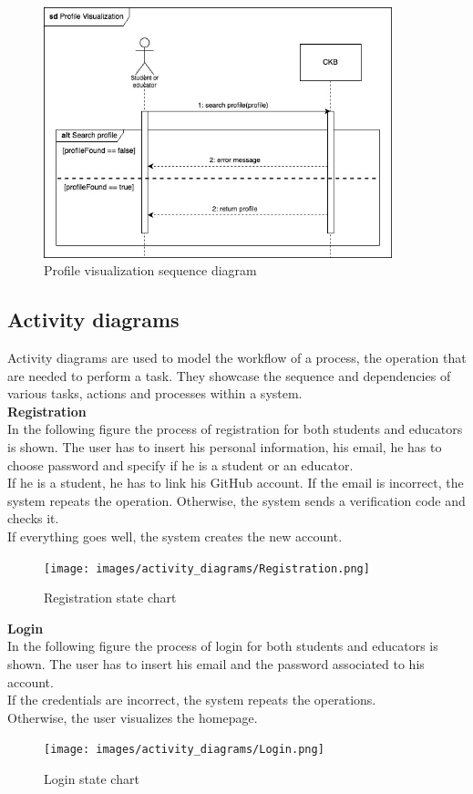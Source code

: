 \begin{figure}[H]
    \centering
    \includegraphics[width=0.9\textwidth]{images/seq_diagrams/profile_visualization.jpg}
    \caption{Profile visualization sequence diagram}
\end{figure}
\clearpage

\subsection{Activity diagrams}
Activity diagrams are used to model the workflow of a process, the operation that are needed to perform a task.
They showcase the sequence and dependencies of various tasks, actions and processes within a system.\\

\textbf{Registration}\\
In the following figure the process of registration for both students and educators is shown. 
The user has to insert his personal information, his email, he has to choose password and specify if he is a student or an educator.\\
If he is a student, he has to link his GitHub account. 
If the email is incorrect, the system repeats the operation. Otherwise, the system
 sends a verification code and checks it.\\If everything goes well, the system creates the new account.
\begin{figure} [H]
  \centering
  \texttt{[image: images/activity\_diagrams/Registration.png]}
  \caption{Registration state chart}
\end{figure} \vspace{1cm}

\textbf{Login}\\
In the following figure the process of login for both students and educators is shown. 
The user has to insert his email and the password associated to his account.
\\If the credentials are incorrect, the system repeats the operations. \\Otherwise, the user visualizes the homepage.
\begin{figure} [H]
  \centering
  \texttt{[image: images/activity\_diagrams/Login.png]}
  \caption{Login state chart}
\end{figure} \vspace{1cm}

